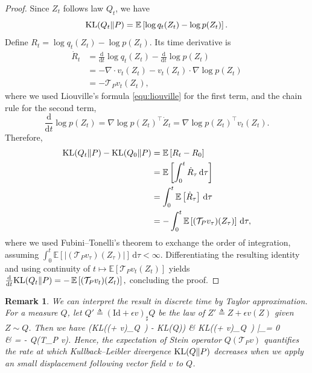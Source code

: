 \documentclass[12pt,paper=letter]{scrreprt}
\newtheorem{remark}{Remark}[chapter]
\def\mbb#1{\mathbb{#1}}
\def\defeq{\triangleq} %
\def\E{\mbb{E}} %
\def\KL#1#2{\textnormal{KL}({#1}\Vert{#2})}
\newcommand{\dd}{\mathrm{d}}
\def\Id{\mathrm{Id}} %
\newcommand{\df}{\mathrm{d}}
\def\bb#1\ee{\begin{align*}#1\end{align*}}
\begin{document}
\begin{proof}  
Since $Z_t$ follows law $Q_t$, we have  
\[
\KL{Q_t}{P} = \E\left[\log q_t(Z_t) - \log p(Z_t)\right]. 
\]
Define $R_t = \log q_t(Z_t) - \log p(Z_t)$. Its time derivative is
\begin{align*}  
\dot R_t 
&= \frac{\df}{\df t} \log q_t(Z_t) - \frac{\df}{\df t} \log p(Z_t)  \\
&= - \nabla \cdot v_t(Z_t) - v_t(Z_t) \cdot \nabla \log  p(Z_t) \\
&= -\mathcal{T}_P v_t(Z_t),
\end{align*}
where we used Liouville’s formula \eqref{equ:liouville} for the first term,
and the chain rule for the second term,
\[
\frac{\df}{\df t} \log p(Z_t)
=
\nabla \log p(Z_t)^\top \dot Z_t
=
\nabla \log p(Z_t)^\top v_t(Z_t).
\]
Therefore,
\begin{align*}
\KL{Q_t}{P} - \KL{Q_0}{P} 
&= \E\left[R_t - R_0\right] \\
&= \E\left[\int_0^t \dot R_\tau\, \df \tau \right] \\
&= \int_0^t \E\left[\dot R_\tau\right]\, \df \tau \\
&= -\int_0^t \E\left[(\mathcal{T}_P v_\tau)(Z_\tau)\right]\, \df \tau,
\end{align*}
where we used Fubini--Tonelli’s theorem to exchange the order of integration, assuming  
\(\int_0^t \E [ \lvert (\mathcal{T}_P v_\tau)(Z_\tau)\rvert ]\, \df \tau < \infty\).
Differentiating the resulting identity and using continuity of  
\( t \mapsto \E \left[\mathcal T_P v_t(Z_t)\right] \) yields
$ 
\frac{\mathrm{d}}{\mathrm{d}t}\KL{Q_t}{P}
 = -\,\E\left[(\mathcal{T}_P v_t)(Z_t)\right],$
concluding the proof.
\end{proof}


\begin{remark}
We can interpret the result in discrete time by Taylor approximation.  
For a measure $Q$, 
let $Q' \defeq (\Id + \epsilon v)_\sharp Q$ be the law of $Z' \defeq Z + \epsilon v(Z)$ given $Z\sim Q$. Then we have 
\bb
\frac{1}{\epsilon}(\KL{(\Id + \epsilon v)_\sharp Q~}{~P}  
- \KL{Q}{P}) & 
\approx \frac{\dd}{\dd \epsilon} \KL{(\Id + \epsilon v)_\sharp Q~}{~P}  \bigg|_{\epsilon = 0}  \\ 
& = -  Q(\mathcal T_P v).
\ee 
Hence, the expectation of Stein operator $ Q(\mathcal T_P v)$ quantifies the rate at which Kullback--Leibler divergence $\KL{Q}{P}$ decreases when we apply an small displacement following vector field $v$ to $Q$.
\end{remark}
\end{document}
